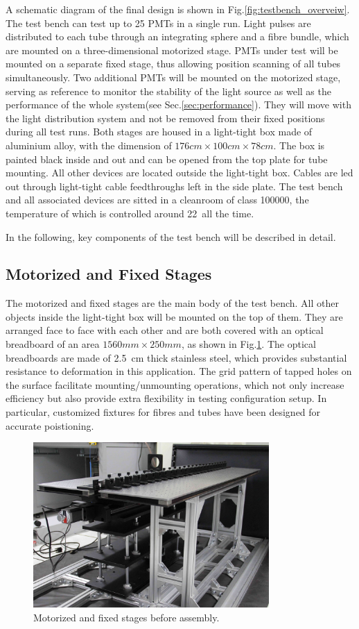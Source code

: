 \documentclass[5p, times]{elsarticle}
\begin{document}
A schematic diagram of the final design is shown in Fig.\ref{fig:testbench_overveiw}.
The test bench can test up to 25 PMTs in a single run.
Light pulses are distributed to each tube through an integrating sphere and a fibre bundle, which are mounted on a three-dimensional motorized stage.
PMTs under test will be mounted on a separate fixed stage, thus allowing position scanning of all tubes simultaneously.
Two additional PMTs will be mounted on the motorized stage, serving as reference to monitor the stability of the light source as well as the performance of the whole system(see Sec.\ref{sec:performance}).
They will move with the light distribution system and not be removed from their fixed positions during all test runs. 
Both stages are housed in a light-tight box made of aluminium alloy, with the dimension of $176cm\times100cm\times78cm$.
The box is painted black inside and out and can be opened from the top plate for tube mounting.
All other devices are located outside the light-tight box.
Cables are led out through light-tight cable feedthroughs left in the side plate.
The test bench and all associated devices are sitted in a cleanroom of class 100000, the temperature of which is controlled around 22\textcelsius~all the time.

In the following, key components of the test bench will be described in detail.
\subsection{Motorized and Fixed Stages}
\label{sec:stages}

The motorized and fixed stages are the main body of the test bench.
All other objects inside the light-tight box will be mounted on the top of them.
They are arranged face to face with each other and are both covered with an optical breadboard of an area $1560mm\times250mm$, as shown in Fig.\ref{fig:stages}.
The optical breadboards are made of \SI{2.5}{cm} thick stainless steel, which provides substantial resistance to deformation in this application.
The grid pattern of tapped holes on the surface facilitate mounting/unmounting operations, which not only increase efficiency but also provide extra flexibility in testing configuration setup.
In particular, customized fixtures for fibres and tubes have been designed for accurate poistioning.

\begin{figure}[h!]
 \centering
 \includegraphics[width=90mm]{stage1_crop}
\caption{Motorized and fixed stages before assembly.}
\label{fig:stages}
\end{figure} 
\end{document}

